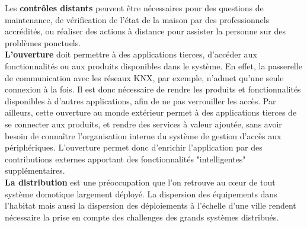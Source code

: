 Les {\bf contrôles distants} peuvent être nécessaires pour des questions de maintenance, de vérification de l'état de la maison par des professionnels accrédités, ou réaliser des actions à distance pour assister la personne sur des problèmes ponctuels.\\




{\bf L'ouverture} doit permettre à des applications tierces, d'accéder aux fonctionnalités ou aux produits disponibles dans le système. En effet, la passerelle de communication avec les réseaux KNX, par exemple, n'admet qu'une seule connexion à la fois. Il est donc nécessaire de rendre les produits et fonctionnalités disponibles à d'autres applications, afin de ne pas verrouiller les accès. Par ailleurs, cette ouverture au monde extérieur permet à des applications tierces de se connecter aux produits, et rendre des services à valeur ajoutée, sans avoir besoin de connaître l'organisation interne du système de gestion d'accès aux périphériques. L'ouverture permet donc d'enrichir l'application par des contributions externes apportant des fonctionnalités "intelligentes" supplémentaires.\\

{\bf La distribution} est une préoccupation que l'on retrouve au c\oe ur de tout système domotique largement déployé. La dispersion des équipements dans l'habitat mais aussi la dispersion des déploiements à l'échelle d'une ville rendent nécessaire la prise en compte des challenges des grands systèmes distribués.\\


